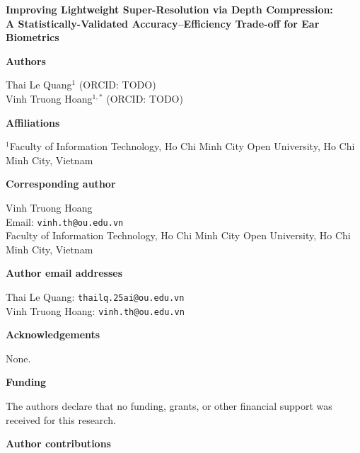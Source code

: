 \documentclass[11pt]{article}
\begin{document}
\thispagestyle{empty}

\begin{center}
{\LARGE\bfseries Improving Lightweight Super-Resolution via Depth Compression:\\[2mm]
A Statistically-Validated Accuracy--Efficiency Trade-off for Ear Biometrics}
\end{center}

\vspace{8mm}

\noindent\textbf{Authors}

\vspace{2mm}
\noindent Thai Le Quang$^{1}$ (ORCID: TODO)\\
Vinh Truong Hoang$^{1,*}$ (ORCID: TODO)

\vspace{4mm}
\noindent\textbf{Affiliations}

\vspace{2mm}
\noindent $^{1}$Faculty of Information Technology, Ho Chi Minh City Open University, Ho Chi Minh City, Vietnam

\vspace{4mm}
\noindent\textbf{Corresponding author}

\vspace{2mm}
\noindent Vinh Truong Hoang\\
Email: \texttt{vinh.th@ou.edu.vn}\\
Faculty of Information Technology, Ho Chi Minh City Open University, Ho Chi Minh City, Vietnam

\vspace{4mm}
\noindent\textbf{Author email addresses}

\vspace{2mm}
\noindent Thai Le Quang: \texttt{thailq.25ai@ou.edu.vn}\\
Vinh Truong Hoang: \texttt{vinh.th@ou.edu.vn}

\vspace{4mm}
\noindent\textbf{Acknowledgements}

\vspace{2mm}
\noindent None.

\vspace{4mm}
\noindent\textbf{Funding}

\vspace{2mm}
\noindent The authors declare that no funding, grants, or other financial support was received for this research.

\vspace{4mm}
\noindent\textbf{Author contributions}
\end{document}
